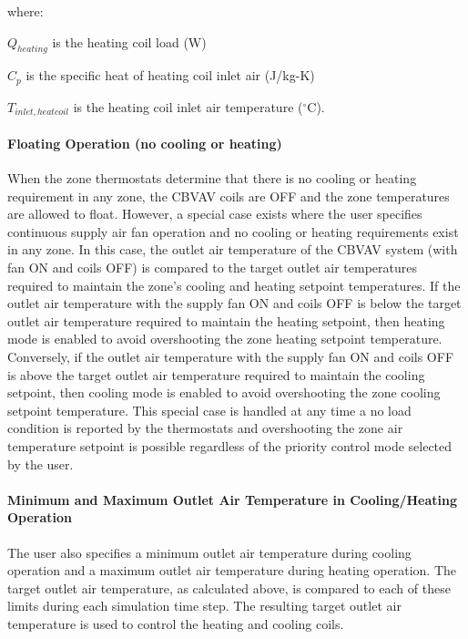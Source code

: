 where:

\({Q_{heating}}\) is the heating coil load (W)

\({C_p}\) is the specific heat of heating coil inlet air (J/kg-K)

\({T_{inlet,heatcoil}}\) is the heating coil inlet air temperature (\(^{\circ}\)C).

\paragraph{Floating Operation (no cooling or heating)}\label{floating-operation-no-cooling-or-heating}

When the zone thermostats determine that there is no cooling or heating requirement in any zone, the CBVAV coils are OFF and the zone temperatures are allowed to float. However, a special case exists where the user specifies continuous supply air fan operation and no cooling or heating requirements exist in any zone. In this case, the outlet air temperature of the CBVAV system (with fan ON and coils OFF) is compared to the target outlet air temperatures required to maintain the zone's cooling and heating setpoint temperatures. If the outlet air temperature with the supply fan ON and coils OFF is below the target outlet air temperature required to maintain the heating setpoint, then heating mode is enabled to avoid overshooting the zone heating setpoint temperature. Conversely, if the outlet air temperature with the supply fan ON and coils OFF is above the target outlet air temperature required to maintain the cooling setpoint, then cooling mode is enabled to avoid overshooting the zone cooling setpoint temperature. This special case is handled at any time a no load condition is reported by the thermostats and overshooting the zone air temperature setpoint is possible regardless of the priority control mode selected by the user.

\paragraph{Minimum and Maximum Outlet Air Temperature in Cooling/Heating Operation}\label{minimum-and-maximum-outlet-air-temperature-in-coolingheating-operation}

The user also specifies a minimum outlet air temperature during cooling operation and a maximum outlet air temperature during heating operation. The target outlet air temperature, as calculated above, is compared to each of these limits during each simulation time step. The resulting target outlet air temperature is used to control the heating and cooling coils.

